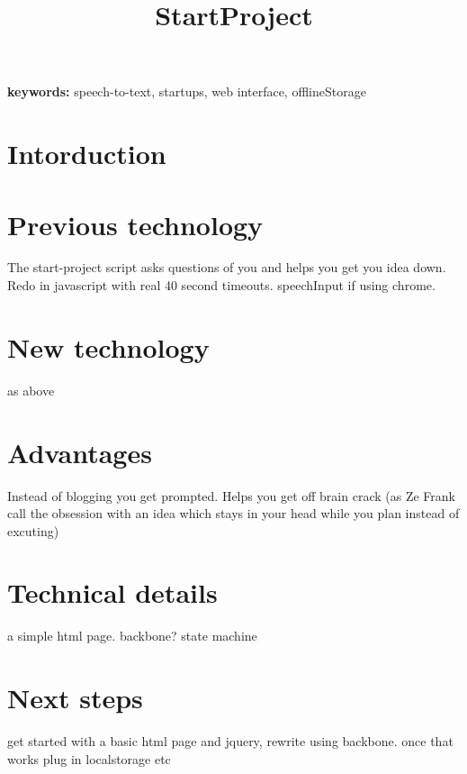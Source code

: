 \documentclass[12pt]{article}
\author{}
\title{ {\Huge StartProject } }
\begin{document}
\maketitle


{\bf keywords: } speech-to-text, startups, web interface, offlineStorage 



\section{Intorduction}



\section{Previous technology}
The start-project script asks questions of you and helps you get you idea down. Redo in javascript with real 40 second timeouts. speechInput if using chrome. 


\section{New technology}
as above


\section{Advantages}
Instead of blogging you get prompted. Helps you get off brain crack (as Ze Frank call the obsession with an idea which stays in your head while you plan instead of excuting)


\section{Technical details}
a simple html page. backbone? state machine


\section{Next steps}
get started with a basic html page and jquery, rewrite using backbone. once that works plug in localstorage etc



%
%
\end{document}

